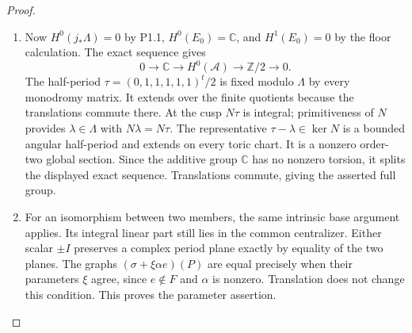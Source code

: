 \documentclass[11pt,a4paper]{article}
\theoremstyle{definition}
\begin{document}
\begin{proof}
\begin{enumerate}[label=\arabic*.]
\item Now $H^0(j_*\Lambda)=0$ by P1.1,
$H^0(E_0)=\mathbb C$, and $H^1(E_0)=0$ by the floor
calculation. The exact sequence gives
\[
0\to\mathbb C\to H^0(\mathcal A)\to\mathbb Z/2\to0.
\]
The half-period
$\tau=(0,1,1,1,1,1)^t/2$ is fixed modulo $\Lambda$
by every monodromy matrix. It extends over the finite
quotients because the translations commute there.
At the cusp $N\tau$ is integral; primitiveness of $N$
provides $\lambda\in\Lambda$ with $N\lambda=N\tau$.
The representative $\tau-\lambda\in\ker N$ is a bounded
angular half-period and extends on every toric chart.
It is a nonzero order-two global section. Since the
additive group $\mathbb C$ has no nonzero torsion, it
splits the displayed exact sequence. Translations
commute, giving the asserted full group.

\item For an isomorphism between two members, the same intrinsic
base argument applies. Its integral linear part still
lies in the common centralizer. Either scalar $\pm I$
preserves a complex period plane exactly by equality
of the two planes. The graphs
$(\sigma+\xi\alpha e)(P)$ are equal precisely when their
parameters $\xi$ agree, since $e\notin F$ and $\alpha$
is nonzero. Translation does not change this condition.
This proves the parameter assertion.

\end{enumerate}
\end{proof}
\end{document}

